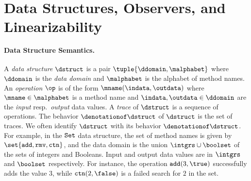 \section{Data Structures, Observers, and Linearizability}
\label{linearizability:section}

\paragraph{Data Structure Semantics.}
A {\it data structure} $\dstruct$ is a pair
$\tuple{\ddomain,\malphabet}$ 
where $\ddomain$ is the {\it data domain} and 
$\malphabet$ is the alphabet of method names.
%
An {\it operation} 
$\op$ is of the form
$\mname(\indata,\outdata)$ where 
$\mname\in\malphabet$ is a method name and 
$\indata,\outdata\in\ddomain$ are the {\it input} resp.\ {\it output}
data values.
%
A {\it trace} of $\dstruct$ is a sequence of operations.
%
The behavior $\denotationof\dstruct$
of $\dstruct$ is the set of traces.
%
We often identify $\dstruct$ with its behavior $\denotationof\dstruct$.
For example, in the ${\tt Set}$ data structure, the set of method names
is given by $\set{{\tt add}, {\tt rmv}, {\tt ctn}}$,
and the data domain is the  union $\intgrs\cup\boolset$
of the sets of integers and Booleans.
%
Input and output data values are in $\intgrs$ and $\boolset$
respectively.
%
For instance, the operation ${\tt add}(3,\true)$ successfully adds the value
$3$, while ${\tt ctn}(2,\false)$ is a failed search
for $2$ in the set.
%


